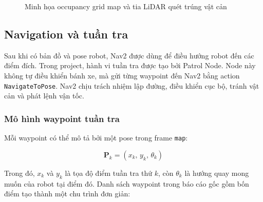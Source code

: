 \begin{figure}[H]
\centering
{}
\caption{Minh họa occupancy grid map và tia LiDAR quét trúng vật cản}
\label{fig:occupancy-grid-lidar}
\end{figure}

\subsection{Navigation và tuần tra}
\label{subsec:navigation-patrol}

Sau khi có bản đồ và pose robot, Nav2 được dùng để điều hướng robot đến các điểm đích. Trong project, hành vi tuần tra được tạo bởi Patrol Node. Node này không tự điều khiển bánh xe, mà gửi từng waypoint đến Nav2 bằng action \texttt{NavigateToPose}. Nav2 chịu trách nhiệm lập đường, điều khiển cục bộ, tránh vật cản và phát lệnh vận tốc.

\subsubsection{Mô hình waypoint tuần tra}
\label{subsubsec:patrol-waypoint-model}

Mỗi waypoint có thể mô tả bởi một pose trong frame \texttt{map}:

\begin{equation}
    \mathbf{P}_k = (x_k,\, y_k,\, \theta_k)
    \label{eq:patrol-waypoint-pose}
\end{equation}

Trong đó, $x_k$ và $y_k$ là tọa độ điểm tuần tra thứ $k$, còn $\theta_k$ là hướng quay mong muốn của robot tại điểm đó. Danh sách waypoint trong báo cáo gốc gồm bốn điểm tạo thành một chu trình đơn giản:

